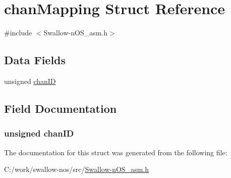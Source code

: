 \hypertarget{structchan_mapping}{}\section{chan\+Mapping Struct Reference}
\label{structchan_mapping}


{\ttfamily \#include $<$Swallow-\/n\+O\+S\+\_\+asm.\+h$>$}

\subsection*{Data Fields}
\begin{DoxyCompactItemize}
\item 
unsigned \hyperlink{structchan_mapping_a362041784411a8f379cf788c5fc8986c}{chan\+I\+D}
\end{DoxyCompactItemize}


\subsection{Field Documentation}
\hypertarget{structchan_mapping_a362041784411a8f379cf788c5fc8986c}{}
\subsubsection[{chan\+I\+D}]{\setlength{\rightskip}{0pt plus 5cm}unsigned chan\+I\+D}\label{structchan_mapping_a362041784411a8f379cf788c5fc8986c}


The documentation for this struct was generated from the following file\+:\begin{DoxyCompactItemize}
\item 
C\+:/work/swallow-\/nos/src/\hyperlink{_swallow-n_o_s__asm_8h}{Swallow-\/n\+O\+S\+\_\+asm.\+h}\end{DoxyCompactItemize}
